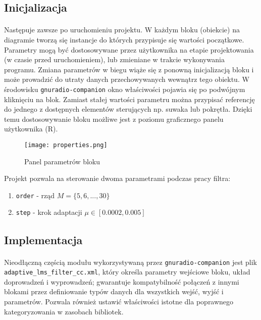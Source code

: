 \subsection{Inicjalizacja}
\paragraph{}
Następuje zawsze po uruchomieniu projektu. 
W każdym bloku (obiekcie) na diagramie tworzą się instancje do których przypisuje się wartości początkowe.
Parametry mogą być dostosowywane przez użytkownika na etapie projektowania (w czasie przed uruchomieniem), lub zmieniane w trakcie wykonywania programu.
Zmiana parametrów w biegu wiąże się z ponowną inicjalizacją bloku i może prowadzić do utraty danych przechowywanych wewnątrz tego obiektu. W środowisku \texttt{gnuradio-companion} okno właściwości pojawia się po podwójnym kliknięciu na blok. Zamiast stałej wartości parametru można przypisać referencję do jednego z dostępnych elementów sterujących np. suwaka lub pokrętła. Dzięki temu dostosowywanie bloku możliwe jest z poziomu graficznego panelu użytkownika (R).

\begin{figure}[t]
\centering
\texttt{[image: properties.png]}
\caption{Panel parametrów bloku}
\label{blockproperties}
\end{figure}

Projekt pozwala na sterowanie dwoma parametrami podczas pracy filtra:
\begin{enumerate}
\item \texttt{order} - rząd $M = \{5,6,...,30\}$
\item \texttt{step} - krok adaptacji $\mu \in [0.0002, 0.005]$
\end{enumerate}

\subsection{Implementacja}
\paragraph{}
Nieodłączną częścią modułu wykorzystywaną przez \texttt{gnuradio-companion} jest plik \texttt{adaptive\_lms\_filter\_cc.xml}, który określa parametry wejściowe bloku, układ doprowadzeń i wyprowadzeń; gwarantuje kompatybilność połączeń z innymi blokami przez definiowanie typów danych dla wszystkich wejść, wyjść i parametrów. 
Pozwala również ustawić właściwości istotne dla poprawnego kategoryzowania w zasobach bibliotek.

